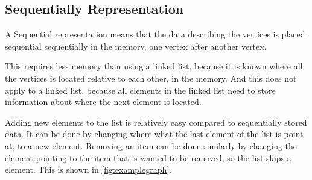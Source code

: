 \subsection{Sequentially Representation}
A Sequential representation means that the data describing the vertices is placed sequential sequentially in the memory, one vertex after another vertex. 

This requires less memory than using a linked list, because it is known where all the vertices is located relative to each other, in the memory. And this does not apply to a linked list, because all elements in the linked list need to store information about where the next element is located.

Adding new elements to the list is relatively easy compared to sequentially stored data.
It can be done by changing where what the last element of the list is point at, to a new element.
Removing an item can be done similarly by changing the element pointing to the item that is wanted to be removed, so the list skips a element. This is shown in \cref{fig:examplegraph}. %






